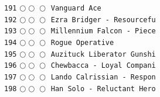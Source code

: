 \documentclass[a4paper,landscape]{article}
\begin{document}
\begin{multicols*}{5}
\texttt{191} \(\bigcirc\!\bigcirc\!\bigcirc\)  \texttt{Vanguard Ace} \vspace{-0.3mm}\\ 
\texttt{192} \(\bigcirc\!\bigcirc\!\bigcirc\)  \texttt{Ezra Bridger - Resourcefu} \vspace{-0.3mm}\\ 
\texttt{193} \(\bigcirc\!\bigcirc\!\bigcirc\)  \texttt{Millennium Falcon - Piece} \vspace{-0.3mm}\\ 
\texttt{194} \(\bigcirc\!\bigcirc\!\bigcirc\)  \texttt{Rogue Operative} \vspace{-0.3mm}\\ 
\texttt{195} \(\bigcirc\!\bigcirc\!\bigcirc\)  \texttt{Auzituck Liberator Gunshi} \vspace{-0.3mm}\\ 
\texttt{196} \(\bigcirc\!\bigcirc\!\bigcirc\)  \texttt{Chewbacca - Loyal Compani} \vspace{-0.3mm}\\ 
\texttt{197} \(\bigcirc\!\bigcirc\!\bigcirc\)  \texttt{Lando Calrissian - Respon} \vspace{-0.3mm}\\ 
\texttt{198} \(\bigcirc\!\bigcirc\!\bigcirc\)  \texttt{Han Solo - Reluctant Hero} \vspace{-0.3mm}\\ 

\end{multicols*}
\end{document}
